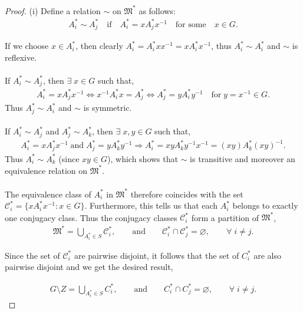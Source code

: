 \begin{proof}
(i) Define a relation $\sim$ on  $\mathfrak{M}^*$  as follows:
\begin{align*} A_i^* \sim A_j^* \quad \text{if} \quad A_i^* = xA_j^*x^{-1} \quad \text{for some} \quad x \in G.
\end{align*}

 \space If we choose $x \in A_i^*$, then clearly $A_i^* = A_i^*xx^{-1} = xA_i^*x^{-1}$, thus $A_i^* \sim A_i^*$ and $\sim$ is reflexive.\\
\\
 \space If $A_i^* \sim A_j^*$, then $\exists \; x \in G$ such that,
\begin{align*} A_i^*= xA_j^*x^{-1} \iff x^{-1}A_i^*x = A_j^* \iff A_j^* = yA_i^*y^{-1} \quad \text{for} \; y = x^{-1} \in G.
\end{align*}
Thus $A_j^* \sim A_i^*$ and $\sim$ is symmetric.\\
\\
 \space If $A_i^* \sim A_j^*$ and $A_j^* \sim A_k^*$, then $\exists \; x, y \in G$  such that,
\begin{align*} A_i^* = xA_j^*x^{-1} \; \text{and} \; A_j^* = yA_k^*y^{-1} \Rightarrow A_i^* = xyA_k^*y^{-1}x^{-1} = (xy)A_k^*(xy)^{-1}.
\end{align*}
Thus $A_i^* \sim A_k^*$ (since $xy \in G$), which shows that $\sim$ is transitive and moreover an equivalence relation on $\mathfrak{M}^*$. \\
\\
The equivalence class of $A_i^*$ in $\mathfrak{M}^*$ therefore coincides with the set $\mathcal{C}_i^* = \{ xA_i^*x^{-1} : x \in G \}$. Furthermore, this tells us that each $A_i^*$ belongs to exactly one conjugacy class. Thus the conjugacy classes $\mathcal{C}_i^*$ form a partition of $\mathfrak{M}^*$,
\begin{align*} \mathfrak{M}^* = \bigcup\limits_{A_i^* \in S} \mathcal{C}_i^*,  \qquad \text{and}  \qquad \mathcal{C}_i^* \cap \mathcal{C}_j^* = \varnothing, \qquad \forall \; i \neq j.
\end{align*}

Since the set of $\mathcal{C}_i^*$ are pairwise disjoint, it follows that the set of $C_i^*$ are also pairwise disjoint and we get the desired result,

\begin{align*} G \! \setminus \! Z = \bigcup\limits_{A_i^* \in S} C_i^*,  \qquad \text{and}  \qquad C_i^* \cap C_j^* = \varnothing, \qquad \forall \; i \neq j.
\end{align*}


\end{proof}

